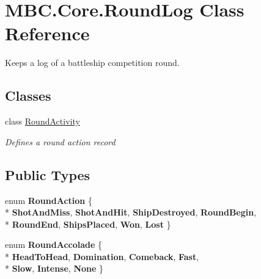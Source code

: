 \hypertarget{class_m_b_c_1_1_core_1_1_round_log}{\section{M\-B\-C.\-Core.\-Round\-Log Class Reference}
\label{class_m_b_c_1_1_core_1_1_round_log}
}


Keeps a log of a battleship competition round. 


\subsection*{Classes}
\begin{DoxyCompactItemize}
\item 
class \hyperlink{class_m_b_c_1_1_core_1_1_round_log_1_1_round_activity}{Round\-Activity}
\begin{DoxyCompactList}\small\item\em Defines a round action record\end{DoxyCompactList}\end{DoxyCompactItemize}
\subsection*{Public Types}
\begin{DoxyCompactItemize}
\item 
enum {\bfseries Round\-Action} \{ \\*
{\bfseries Shot\-And\-Miss}, 
{\bfseries Shot\-And\-Hit}, 
{\bfseries Ship\-Destroyed}, 
{\bfseries Round\-Begin}, 
\\*
{\bfseries Round\-End}, 
{\bfseries Ships\-Placed}, 
{\bfseries Won}, 
{\bfseries Lost}
 \}
\item 
enum {\bfseries Round\-Accolade} \{ \\*
{\bfseries Head\-To\-Head}, 
{\bfseries Domination}, 
{\bfseries Comeback}, 
{\bfseries Fast}, 
\\*
{\bfseries Slow}, 
{\bfseries Intense}, 
{\bfseries None}
 \}
\end{DoxyCompactItemize}
